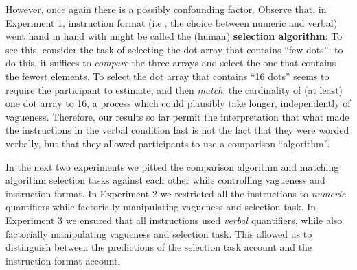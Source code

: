 However, once again there is a possibly confounding factor. Observe that, in Experiment 1, instruction format (i.e., the choice between numeric and verbal) went hand in hand with might be called the (human) {\bf selection algorithm}: To see this, consider the task of selecting the dot array that contains ``few dots'': to do this, it suffices to {\em compare} the three arrays and select the one that contains the fewest elements.  To select the dot array that contains ``16 dots'' seems to require the participant to estimate, and then {\em match}, the cardinality of (at least) one dot array to 16, a process which could plausibly take longer, independently of vagueness. Therefore, our results so far permit the interpretation that what made the instructions in the verbal condition fast is not the fact that they were worded verbally, but that they allowed participants to use a comparison ``algorithm''.

In the next two experiments we pitted the comparison algorithm and matching algorithm selection tasks against each other while controlling vagueness and instruction format. In Experiment 2 we restricted all the instructions to \emph{numeric} quantifiers while factorially manipulating vagueness and selection task. In Experiment 3 we ensured that all instructions used \emph{verbal} quantifiers, while also factorially manipulating vagueness and selection task. This allowed us to distinguish between the predictions of the selection task account and the instruction format account. 
